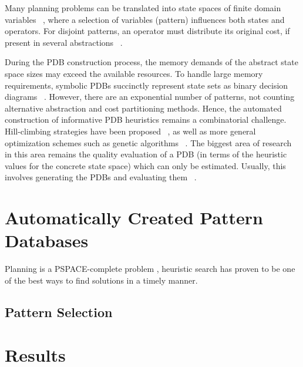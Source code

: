Many planning problems can be translated into state spaces of finite domain variables ~\cite{Helmert:MultiVariate}, where a selection of variables (pattern) influences both states and operators. For disjoint patterns, an operator must distribute its original cost, if present in several abstractions ~\cite{Katz:2008Optimal,Yang:08General}. 

During the PDB construction process, the memory demands of the abstract state space sizes may exceed the available resources. To handle large memory requirements, symbolic PDBs succinctly represent state sets as binary decision diagrams ~\cite{Edelkamp:SymbolicPlan}. However, there are an exponential number of patterns, not counting alternative abstraction and cost partitioning methods. Hence, the automated construction of informative PDB heuristics remains a combinatorial challenge. Hill-climbing strategies have been proposed ~\cite{Haslum:07}, as well as more general optimization schemes such as genetic algorithms ~\cite{Edelkamp:GA,Franco:CPC}. The biggest area of research in this area remains the quality evaluation of a PDB (in terms of the heuristic values for the concrete state space) which can only be estimated. Usually, this involves generating the PDBs and evaluating them ~\cite{Edelkamp:PlanningPDb,Korf:Rubik}. 

\section{Automatically Created Pattern Databases}

Planning is a PSPACE-complete problem \cite{Bylander:Complexity}, heuristic search has proven to be one of the best ways to find solutions in a timely manner. 

\subsection{Pattern Selection}

\section{Results}